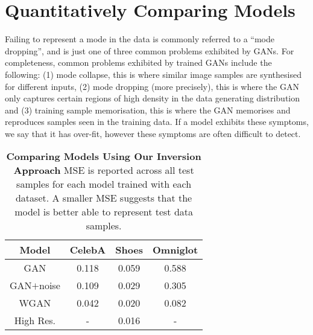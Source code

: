 \documentclass[journal]{IEEEtran}
\begin{document}
\section{Quantitatively Comparing Models}

\label{sec:troubleshooting}


Failing to represent a mode in the data is commonly referred to a ``mode dropping'', and is just one of three common problems exhibited by GANs. For completeness, common problems exhibited by trained GANs include the following: (1) mode collapse, this is where similar image samples are synthesised for different inputs, (2) mode dropping (more precisely), this is where the GAN only captures certain regions of high density in the data generating distribution and (3) training sample memorisation, this is where the GAN memorises and reproduces samples seen in the training data. If a model exhibits these symptoms, we say that it has over-fit, however these symptoms are often difficult to detect.



\begin{table}[h!]
    \centering
    \caption{\textbf{Comparing Models Using Our Inversion Approach} MSE is reported across all test samples for each model trained with each dataset. A smaller MSE suggests that the model is better able to represent test data samples.}
    \label{tab:compare}
    \begin{tabular}{c c c c}
        \textbf{Model}  & CelebA & Shoes & Omniglot\\ \toprule 
        GAN \cite{radford2015unsupervised} & 0.118 & 0.059 & 0.588\\
        GAN$+$noise \cite{arjovsky2017towards} & 0.109 & 0.029 & 0.305\\
        WGAN \cite{arjovsky2017wasserstein} & 0.042 &  0.020 & 0.082\\ \hdashline[1pt/5pt]
        High Res. & -  & 0.016 & - \\ \bottomrule
    \end{tabular}
\end{table}
\end{document}
